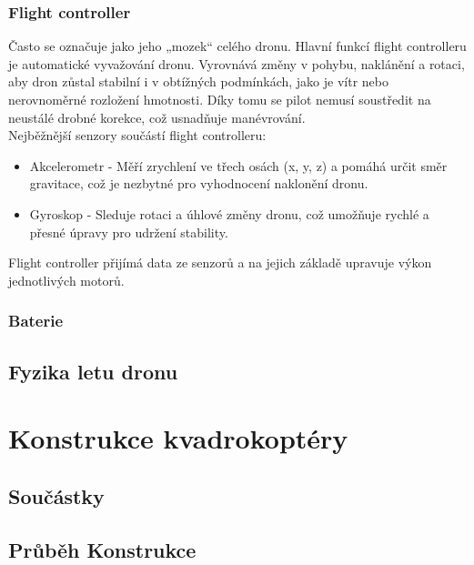 \documentclass[12pt]{report}
\begin{document}
\section{Flight controller}

Často se označuje jako jeho „mozek“ celého dronu. Hlavní funkcí flight controlleru je automatické vyvažování dronu. Vyrovnává změny v pohybu, naklánění a rotaci, aby dron zůstal stabilní i v obtížných podmínkách, jako je vítr nebo nerovnoměrné rozložení hmotnosti. Díky tomu se pilot nemusí soustředit na neustálé drobné korekce, což usnadňuje manévrování.\\

Nejběžnější senzory součástí flight controlleru:
\begin{itemize}
	\item Akcelerometr -  Měří zrychlení ve třech osách (x, y, z) a pomáhá určit směr gravitace, což je nezbytné pro vyhodnocení naklonění dronu.
	\item Gyroskop - Sleduje rotaci a úhlové změny dronu, což umožňuje rychlé a přesné úpravy pro udržení stability.
\end{itemize}

Flight controller přijímá data ze senzorů a na jejich základě upravuje výkon jednotlivých motorů. \cite{mainbook}


\section{Baterie}

\lipsum[2]

\chapter{Fyzika letu dronu}

\lipsum[1]

\part{Konstrukce kvadrokoptéry} %

\chapter{Součástky}
\lipsum[1]	

\chapter{Průběh Konstrukce}
\end{document}
